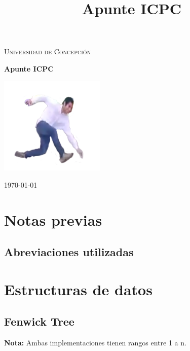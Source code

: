\documentclass[oneside]{book}
\title{Apunte ICPC}
\begin{document}
  {
    \lstset{
        language=C++,
        numbers=left,
        stepnumber=1,
        basicstyle=\footnotesize\ttfamily}
  }
  {
  }

\lstset{
        language=C++,
        numbers=left,
        stepnumber=1,
        tabsize=2,
        breaklines=true,
        basicstyle=\footnotesize\ttfamily}
  
	\begin{titlepage}
	\centering
	
	{\scshape\LARGE Universidad de Concepci\'on \par}
	\vspace{1cm}
	\vspace{1.5cm}
	{\huge\bfseries Apunte ICPC\par}
	\vspace{2cm}
	\includegraphics[width=5cm]{gataca}\par\vspace{1cm}

	\vfill
	

	\vfill

	{\large \today\par}
\end{titlepage}	
	
	
	\tableofcontents

	\frontmatter
	\chapter{Notas previas}
	\section{Abreviaciones utilizadas}
	
	\mainmatter
	\chapter{Estructuras de datos}
	\section{Fenwick Tree}
	\textbf{Nota:} Ambas implementaciones tienen rangos entre 1 a n. 
\end{document}
